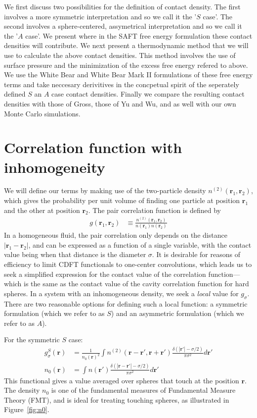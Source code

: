 \documentclass[letterpaper,twocolumn,amsmath,amssymb,jcp,10pt,aip]{revtex4-1}
\newcommand{\rr}{\textbf{r}}
\begin{document}
We first discuss two possibilities for the definition of contact
density.  The first involves a more symmetric interpretation and so we
call it the '$S$ case'.  The second involves a sphere-centered,
assymetrical interpretation and so we call it the '$A$ case'.  We
present where in the SAFT free energy formulation these contact
densities will contribute.  We next present a thermodynamic method
that we will use to calculate the above contact densities.  This
method involves the use of surface pressure and the minimization of
the excess free energy refered to above.  We use the White Bear and
White Bear Mark II formulations of these free energy terms and take
neccesary derivitives in the concpetual spirit of the seperately
defined $S$ an $A$ case contact densities.  Finally we compare the
resulting contact densities with those of Gross, those of Yu and Wu,
and as well with our own Monte Carlo simulations.


\section{Correlation function with inhomogeneity}

We will define our terms by making use of the two-particle density
$n^{(2)}(\rr_1,\rr_2)$, which gives the probability per unit volume of
finding one particle at position $\rr_1$ and the other at position
$\rr_2$.  The pair correlation function is defined by
\begin{align}
  g(\rr_1,\rr_2) &\equiv \frac{n^{(2)}(\rr_1,\rr_2)}{n(\rr_1)n(\rr_2)}
\end{align}
In a homogeneous fluid, the pair correlation only depends on the
distance $|\rr_1-\rr_2|$, and can be expressed as a function of a
single variable, with the contact value being when that distance is
the diameter $\sigma$.  It is desirable for reasons of efficiency to limit CDFT
functionals to one-center convolutions, which leads us to seek a
simplified expression for the contact value of the correlation
function---which is the same as the contact value of the cavity
correlation function for hard spheres.
In a system with an inhomogeneous density, we seek a \emph{local}
value for $g_\sigma$.  There are two reasonable options for defining
such a local function: a symmetric formulation (which we refer to as $S$) and an
asymmetric formulation (which we refer to as $A$).

For the symmetric $S$ case:
\begin{align}
  g^S_\sigma(\rr) &= \frac{1}{n_0(\rr)^2}\int n^{(2)}(\rr - \rr', \rr
  + \rr')
  \frac{\delta(|\rr'| -\sigma/2)}{\pi\sigma^2}d\rr' \label{eq:gS} \\
  n_0(\rr) &= \int n(\rr')\frac{\delta(|\rr-\rr'|-\sigma/2)}{\pi\sigma^2} d\rr'
\end{align}
This functional gives a value averaged over spheres that touch at the
position $\rr$.  The density $n_0$ is one of the fundamental measures
of Fundamental Measure Theory (FMT), and is ideal for treating
touching spheres, as illustrated in Figure~\ref{fig:n0}.
\end{document}
